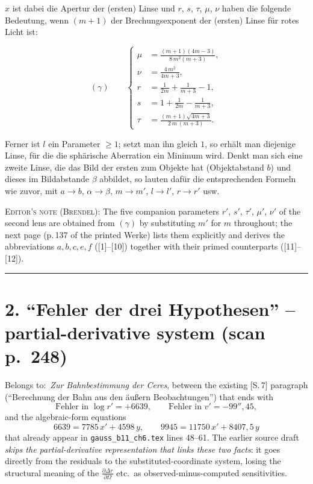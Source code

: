 \documentclass[10pt,a4paper]{article}
\begin{document}
$x$ ist dabei die Apertur der (ersten) Linse und $r$, $s$, $\tau$,
$\mu$, $\nu$ haben die folgende Bedeutung, wenn $(m+1)$ der
Brechungsexponent der (ersten) Linse f\"ur rotes Licht ist:

\begin{equation}
(\gamma)\qquad
\left\{\begin{aligned}
\mu &= \frac{(m+1)(4m-3)}{\,8\,m^{2}(m+3)\,},\\[3pt]
\nu &= \frac{4\,m^{2}}{4m+3},\\[3pt]
r   &= \frac{1}{2m} + \frac{1}{m+3} - 1,\\[3pt]
s   &= 1 + \frac{1}{2m} - \frac{1}{m+3},\\[3pt]
\tau &= \frac{(m+1)\sqrt{4m+3}}{\,2\,m\,(m+3)\,}.
\end{aligned}\right.
\end{equation}

Ferner ist $l$ ein Parameter $\ge 1$; setzt man ihn gleich $1$, so
erh\"alt man diejenige Linse, f\"ur die die sph\"arische Aberration ein
Minimum wird. Denkt man sich eine zweite Linse, die das Bild der
ersten zum Objekte hat (Objektabstand $b$) und dieses im Bildabstande
$\beta$ abbildet, so lauten daf\"ur die entsprechenden Formeln wie
zuvor, mit $a\!\rightarrow\!b$, $\alpha\!\rightarrow\!\beta$,
$m\!\rightarrow\!m'$, $l\!\rightarrow\!l'$, $r\!\rightarrow\!r'$ usw.

\smallskip
\textsf{\footnotesize\textsc{Editor's note (Brendel):} The five
companion parameters $r'$, $s'$, $\tau'$, $\mu'$, $\nu'$ of the second
lens are obtained from $(\gamma)$ by substituting $m'$ for $m$
throughout; the next page (p.\,137 of the printed Werke) lists them
explicitly and derives the abbreviations $a,b,c,e,f$ ([1]--[10])
together with their primed counterparts ([11]--[12]).}

\bigskip\hrule\bigskip

\section*{2. \enquote{Fehler der drei Hypothesen} -- partial-derivative system \hfill (scan p.~248)}


\noindent\textsf{\small Belongs to:}~\textit{Zur Bahnbestimmung der Ceres},
between the existing [S.\,7] paragraph (\enquote{Berechnung der Bahn aus
den \"au\ss ern Beobachtungen}) that ends with
\[
\text{Fehler in } \log r' = +6639,\qquad
\text{Fehler in } v' = -99''\!\!,\!45,
\]
and the algebraic-form equations
\[
6639 = 7785\,x' + 4598\,y, \qquad 9945 = 11750\,x' + 8407{,}5\,y
\]
that already appear in \texttt{gauss\_b11\_ch6.tex} lines 48--61.  The
earlier source draft \emph{skips the partial-derivative representation that
links these two facts}: it goes directly from the residuals to the
substituted-coordinate system, losing the structural meaning of the
$\tfrac{\partial \Delta r}{\partial\Omega}$ etc.\ as observed-minus-computed
sensitivities.
\end{document}
